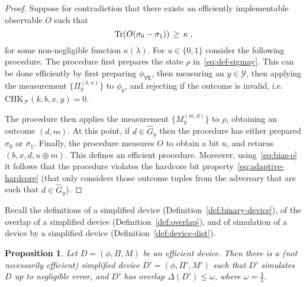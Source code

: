 \documentclass[11pt]{article}
\newtheorem{proposition}[theorem]{Proposition}
\theoremstyle{remark}
\theoremstyle{definition}
\newcommand{\Tr}{\mbox{\rm Tr}}
\newcommand{\reg}[1]{{\textsf{#1}}}
\newcommand{\mY}{\ensuremath{\mathcal{Y}}}
\newcommand{\dset}{G}
\begin{document}
\begin{proof}
Suppose for contradiction that there exists an efficiently implementable observable $O$ such that 
\begin{equation}\label{eq:bias-o}
\Tr(O(\sigma_0-\sigma_1)) \,\geq\, \kappa\;,
\end{equation}
 for some non-negligible function $\kappa(\lambda)$. For $u\in\{0,1\}$ consider the following procedure. The procedure first prepares the state $\rho$ in~\eqref{eq:def-sigmay}. This can be done efficiently by first preparing $\phi_{\reg{YE}}$, then measuring an $y\in \mY$, then applying the measurement $\{\Pi_y^{(b,x)}\}$ to $\phi_y$, and rejecting if the outcome is invalid, i.e. CHK$_{\mathcal{F}}(k,b,x,y)=0$. 

The procedure then applies the measurement $\{M_y^{(m,d)}\}$ to $\rho$, obtaining an outcome $(d,m)$. At this point, if $d\in \hat{\dset}_{y}$ then the procedure has either prepared $\sigma_0$ or $\sigma_1$. Finally, the procedure  measures $O$ to obtain a bit $u$, and returns $(b,x,d,u\oplus m)$. This defines an efficient procedure. Moreover, using~\eqref{eq:bias-o} it follows  that the procedure violates the hardcore bit property~\eqref{eq:adaptive-hardcore} (that only considers those outcome tuples from the adversary that are such that $d\in\hat{\dset}_{y}$). 
\end{proof}

Recall the definitions of a simplified device (Definition~\ref{def:binary-device}), of the overlap of a simplified device (Definition~\ref{def:overlap}), and of simulation of a device by a simplified device (Definition~\ref{def:device-dist}). 

\begin{proposition}\label{prop:change-d}
Let $D=(\phi,\Pi,M)$ be an efficient device. Then there is a (not necessarily efficient) simplified device $D'=(\phi,\Pi',M')$ such that $D'$ simulates $D$ up to negligible error, and $D'$ has overlap $\Delta(D') \leq \omega$, where $\omega = \frac{3}{4}$.
\end{proposition}
\end{document}
